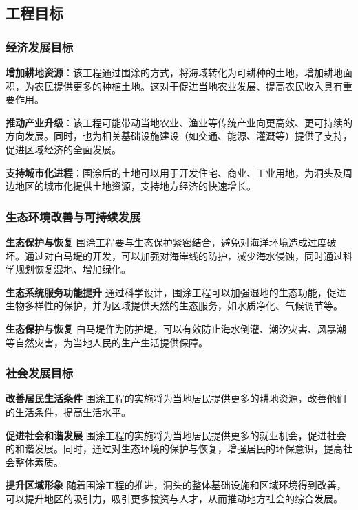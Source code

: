 \documentclass[UTF8, a4paper, 12pt]{ctexart} %
\begin{document}
\subsection{工程目标}
\subsubsection{经济发展目标}
\textbf{增加耕地资源}：该工程通过围涂的方式，将海域转化为可耕种的土地，增加耕地面积，为农民提供更多的种植土地。这对于促进当地农业发展、提高农民收入具有重要作用。
\par \textbf{推动产业升级}：该工程可能带动当地农业、渔业等传统产业向更高效、更可持续的方向发展。同时，也为相关基础设施建设（如交通、能源、灌溉等）提供了支持，促进区域经济的全面发展。
\par \textbf{支持城市化进程}：围涂后的土地可以用于开发住宅、商业、工业用地，为洞头及周边地区的城市化提供土地资源，支持地方经济的快速增长。

\subsubsection{生态环境改善与可持续发展}
\textbf{生态保护与恢复}
围涂工程要与生态保护紧密结合，避免对海洋环境造成过度破坏。通过对白马堤的开发，可以加强对海岸线的防护，减少海水侵蚀，同时通过科学规划恢复湿地、增加绿化。
\par \textbf{生态系统服务功能提升}
通过科学设计，围涂工程可以加强湿地的生态功能，促进生物多样性的保护，并为区域提供天然的生态服务，如水质净化、气候调节等。
\par \textbf{生态保护与恢复}
白马堤作为防护堤，可以有效防止海水倒灌、潮汐灾害、风暴潮等自然灾害，为当地人民的生产生活提供保障。
\subsubsection{社会发展目标}
\par \textbf{改善居民生活条件}
围涂工程的实施将为当地居民提供更多的耕地资源，改善他们的生活条件，提高生活水平。
\par \textbf{促进社会和谐发展}
围涂工程的实施将为当地居民提供更多的就业机会，促进社会的和谐发展。同时，通过对生态环境的保护与恢复，增强居民的环保意识，提高社会整体素质。
\par \textbf{提升区域形象}
随着围涂工程的推进，洞头的整体基础设施和区域环境得到改善，可以提升地区的吸引力，吸引更多投资与人才，从而推动地方社会的综合发展。
\end{document}
